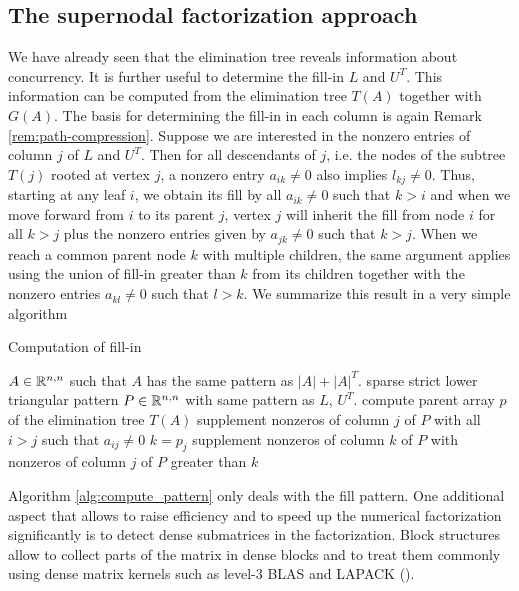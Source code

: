 \subsection{The supernodal factorization approach}
We have already seen that the elimination tree reveals information about
concurrency. It is further useful to determine the fill-in $L$ and $U^T$.
This information can be computed from the elimination tree $T(A)$ together
with $G(A)$. The basis for determining the fill-in in each column is 
again Remark \ref{rem:path-compression}. Suppose we are interested in the
nonzero entries of column $j$ of $L$ and $U^T$. Then for all descendants of $j$,
i.e. the nodes of the subtree $T(j)$ rooted at vertex $j$, a nonzero entry
$a_{ik}\not=0$ also implies $l_{kj}\not=0$. Thus, starting at any leaf $i$,
we obtain its fill by all $a_{ik}\not=0$ such that $k>i$ and when we move forward
from $i$ to its parent $j$, vertex $j$ will inherit the fill from node $i$ for
all $k>j$ plus the nonzero entries given by $a_{jk}\not=0$ such that $k>j$.
When we reach a common parent node $k$ with multiple children, the same argument
applies using the union of fill-in greater than $k$ from its children together
with the nonzero entries $a_{kl}\not=0$ such that $l>k$.
We summarize this result in a very simple algorithm
\begin{programcode}{Computation of fill-in}\label{alg:compute_pattern}
\begin{algorithmic}[1]
  \Require $A\in\mathbb{R}^{n,n}$ such that $A$ has the same pattern as $|A|+|A|^T$.
  \Ensure sparse strict lower triangular pattern $P\in\mathbb{R}^{n,n}$ with
  same pattern as $L$, $U^T$.
  \State compute parent array $p$ of the elimination tree $T(A)$
      \State supplement nonzeros of column $j$ of $P$ with all $i>j$ such that $a_{ij}\not=0$ 
      \State $k=p_j$
         \State supplement nonzeros of column $k$ of $P$ with nonzeros of column $j$ of $P$ greater than $k$
      \EndIf   
  \EndFor
\end{algorithmic}
\end{programcode}



Algorithm \ref{alg:compute_pattern} only deals with the fill pattern. 
One additional aspect that allows to raise efficiency
and to speed up the numerical factorization significantly 
is to detect dense submatrices in the factorization.
Block structures  allow to collect parts
of the matrix in dense blocks and to treat them commonly using 
dense matrix kernels such as level-3 BLAS and LAPACK (\cite{AndBBDDDGHMOS99}).

